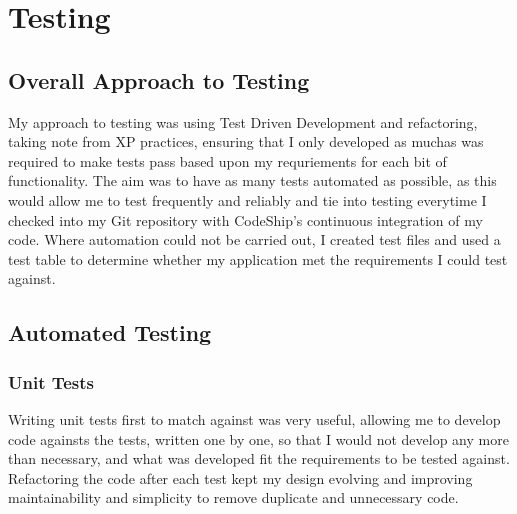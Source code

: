 \chapter{Testing}




\section{Overall Approach to Testing}
My approach to testing was using Test Driven Development and refactoring, taking note from XP practices, ensuring that I only developed as muchas was required to make tests pass based upon my requriements for each bit of functionality. The aim was to have as many tests automated as possible, as this would allow me to test frequently and reliably and tie into testing everytime I checked into my Git repository with CodeShip's continuous integration of my code. Where automation could not be carried out, I created test files and used a test table to determine whether my application met the requirements I could test against.


\section{Automated Testing}
\subsection{Unit Tests}
Writing unit tests first to match against was very useful, allowing me to develop code againsts the tests, written one by one, so that I would not develop any more than necessary, and what was developed fit the requirements to be tested against. Refactoring the code after each test kept my design evolving and improving maintainability and simplicity to remove duplicate and unnecessary code.

